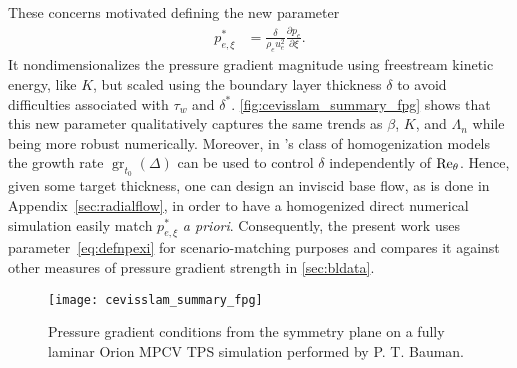These concerns motivated defining the new parameter
\begin{align}
    \label{eq:defnpexi}
    p_{e,\xi}^\ast &= \frac{\delta}{\rho_e u_e^2}
                      \frac{\partial\!p_e}{\partial\!\xi}.
\end{align}
It nondimensionalizes the pressure gradient magnitude using freestream
kinetic energy, like $K$, but scaled using the boundary layer
thickness $\delta$ to avoid difficulties associated with $\tau_w$
and $\delta^\ast$.  \autoref{fig:cevisslam_summary_fpg} shows that this new
parameter qualitatively captures the same trends as $\beta$, $K$, and
$\Lambda_n$ while being more robust numerically.  Moreover,
in \citeauthor{Topalian2014Temporal}'s class of homogenization models
the growth rate $\operatorname{gr}_{t_0}\left(\Delta\right)$ can be
used to control $\delta$ independently of $\Reynolds[\theta]$.  Hence,
given some target thickness, one can design an inviscid base flow, as is
done in Appendix~\ref{sec:radialflow}, in order to have a homogenized direct numerical
simulation easily match $p_{e,\xi}^\ast$ \emph{a priori}.  Consequently, the present work uses
parameter~\eqref{eq:defnpexi} for scenario-matching purposes and compares it
against other measures of pressure gradient strength in
\autoref{sec:bldata}.
%
\enlargethispage{0.25em}

\begin{figure}[p]
  \centering
  \texttt{[image: cevisslam\_summary\_fpg]}
  \caption[
    Pressure gradient conditions from the symmetry plane on a fully laminar
    Orion MPCV thermal protection system simulation
  ]{%
    \label{fig:cevisslam_summary_fpg}
    Pressure gradient conditions from the symmetry plane on a fully laminar
    Orion MPCV TPS simulation performed by P. T. Bauman.
  }
\end{figure}

\clearpage
